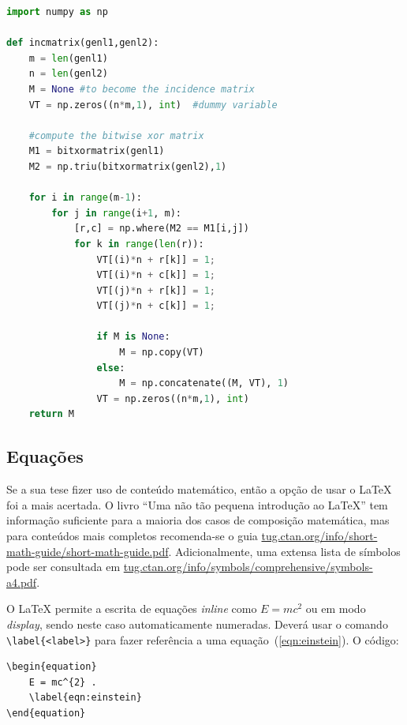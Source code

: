\begin{minipage}{0.9\linewidth}
\begin{lstlisting}[language=Python, caption=Exemplo longo em Python., label=lst:examplo2]
import numpy as np
    
def incmatrix(genl1,genl2):
    m = len(genl1)
    n = len(genl2)
    M = None #to become the incidence matrix
    VT = np.zeros((n*m,1), int)  #dummy variable
    
    #compute the bitwise xor matrix
    M1 = bitxormatrix(genl1)
    M2 = np.triu(bitxormatrix(genl2),1) 

    for i in range(m-1):
        for j in range(i+1, m):
            [r,c] = np.where(M2 == M1[i,j])
            for k in range(len(r)):
                VT[(i)*n + r[k]] = 1;
                VT[(i)*n + c[k]] = 1;
                VT[(j)*n + r[k]] = 1;
                VT[(j)*n + c[k]] = 1;
                
                if M is None:
                    M = np.copy(VT)
                else:
                    M = np.concatenate((M, VT), 1)               
                VT = np.zeros((n*m,1), int)  
    return M
\end{lstlisting}
\end{minipage}



\subsection{Equações}

Se a sua tese fizer uso de conteúdo matemático, então a opção de usar o \LaTeX{} foi a mais acertada. O livro ``Uma não tão pequena introdução ao \LaTeX{}'' tem informação suficiente para a maioria dos casos de composição matemática, mas para conteúdos mais completos recomenda-se o guia \url{tug.ctan.org/info/short-math-guide/short-math-guide.pdf}. Adicionalmente, uma extensa lista de símbolos pode ser consultada em \url{tug.ctan.org/info/symbols/comprehensive/symbols-a4.pdf}.

O \LaTeX{} permite a escrita de equações \textit{inline} como $E = mc^{2}$ ou em modo \textit{display}, sendo neste caso automaticamente numeradas. Deverá usar o comando \verb|\label{<label>}| para fazer referência a uma equação~(\ref{eqn:einstein}). O código:
\newpage
\begin{verbatim}
\begin{equation}
	E = mc^{2} .
	\label{eqn:einstein}
\end{equation}
\end{verbatim}

